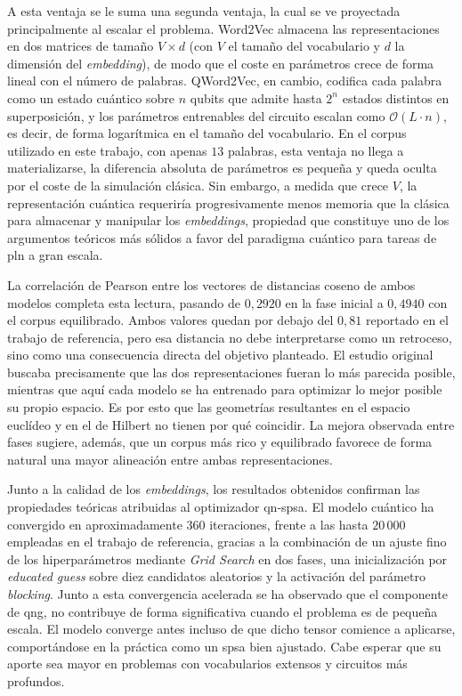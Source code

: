 A esta ventaja se le suma una segunda ventaja, la cual se ve proyectada principalmente al escalar el problema. Word2Vec almacena las representaciones en dos matrices de tamaño $V \times d$ (con $V$ el tamaño del vocabulario y $d$ la dimensión del \textit{embedding}), de modo que el coste en parámetros crece de forma lineal con el número de palabras. QWord2Vec, en cambio, codifica cada palabra como un estado cuántico sobre $n$ qubits que admite hasta $2^n$ estados distintos en superposición, y los parámetros entrenables del circuito escalan como $\mathcal{O}(L \cdot n)$, es decir, de forma logarítmica en el tamaño del vocabulario. En el corpus utilizado en este trabajo, con apenas $13$ palabras, esta ventaja no llega a materializarse, la diferencia absoluta de parámetros es pequeña y queda oculta por el coste de la simulación clásica. Sin embargo, a medida que crece $V$, la representación cuántica requeriría progresivamente menos memoria que la clásica para almacenar y manipular los \textit{embeddings}, propiedad que constituye uno de los argumentos teóricos más sólidos a favor del paradigma cuántico para tareas de \gls{pln} a gran escala.

La correlación de Pearson entre los vectores de distancias coseno de ambos modelos completa esta lectura, pasando de $0{,}2920$ en la fase inicial a $0{,}4940$ con el corpus equilibrado. Ambos valores quedan por debajo del $0{,}81$ reportado en el trabajo de referencia, pero esa distancia no debe interpretarse como un retroceso, sino como una consecuencia directa del objetivo planteado. El estudio original buscaba precisamente que las dos representaciones fueran lo más parecida posible, mientras que aquí cada modelo se ha entrenado para optimizar lo mejor posible su propio espacio. Es por esto que las geometrías resultantes en el espacio euclídeo y en el de Hilbert no tienen por qué coincidir. La mejora observada entre fases sugiere, además, que un corpus más rico y equilibrado favorece de forma natural una mayor alineación entre ambas representaciones.

Junto a la calidad de los \textit{embeddings}, los resultados obtenidos confirman las propiedades teóricas atribuidas al optimizador \gls{qn-spsa}. El modelo cuántico ha convergido en aproximadamente $360$ iteraciones, frente a las hasta $20\,000$ empleadas en el trabajo de referencia, gracias a la combinación de un ajuste fino de los hiperparámetros mediante \textit{Grid Search} en dos fases, una inicialización por \textit{educated guess} sobre diez candidatos aleatorios y la activación del parámetro \textit{blocking}. Junto a esta convergencia acelerada se ha observado que el componente de \gls{qng}, no contribuye de forma significativa cuando el problema es de pequeña escala. El modelo converge antes incluso de que dicho tensor comience a aplicarse, comportándose en la práctica como un \gls{spsa} bien ajustado. Cabe esperar que su aporte sea mayor en problemas con vocabularios extensos y circuitos más profundos.

